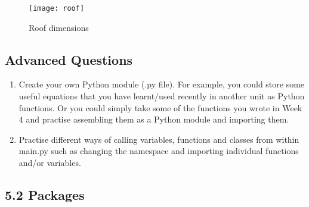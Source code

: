 \documentclass[11pt]{report}
\begin{document}
\begin{figure}[!h]
        \centering
        \texttt{[image: roof]}
        \caption{Roof dimensions}
        \label{fig:roof}
\end{figure}

\subsection*{Advanced Questions}

\begin{enumerate}[label=(\Alph*)]
    
    \item Create your own Python module (.py file). For example, you could store some useful equations that you have learnt/used recently in another unit as Python functions. Or you could simply take some of the functions you wrote in Week 4 and practise assembling them as a Python module and importing them.  
    \item Practise different ways of calling variables, functions and classes from within main.py such as changing the namespace and importing individual functions and/or variables. 
    
\end{enumerate}

\pagebreak

\subsection*{\Large 5.2 Packages}
\end{document}
